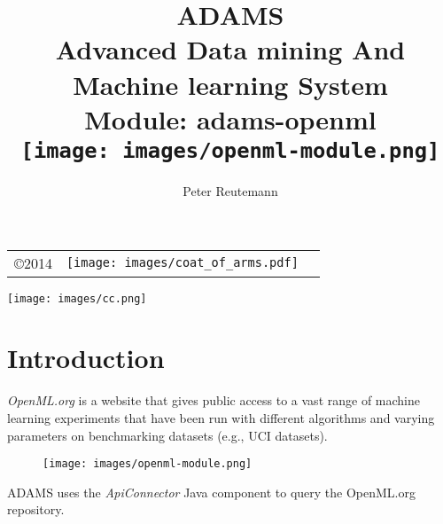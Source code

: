 \documentclass[a4paper]{book}
\title{
  \textbf{ADAMS} \\
  {\Large \textbf{A}dvanced \textbf{D}ata mining \textbf{A}nd \textbf{M}achine
  learning \textbf{S}ystem} \\
  {\Large Module: adams-openml} \\
  \vspace{1cm}
  \texttt{[image: images/openml-module.png]} \\
}
\author{
  Peter Reutemann
}
\begin{document}
\begin{titlepage}
\maketitle

\thispagestyle{empty}
\center
\begin{table}[b]
	\begin{tabular}{c l l}
		\parbox[c][2cm]{2cm}{\copyright 2014} &
		\parbox[c][2cm]{5cm}{\texttt{[image: images/coat\_of\_arms.pdf]}} \\
	\end{tabular}
	\texttt{[image: images/cc.png]} \\
\end{table}

\end{titlepage}

\tableofcontents
\listoffigures

\chapter{Introduction}
\textit{OpenML.org}\cite{openml} is a website that gives public access to a vast range of machine learning experiments that have been run with different algorithms and varying parameters on benchmarking datasets (e.g., UCI datasets).

\begin{figure}[htb]
  \centering
  \texttt{[image: images/openml-module.png]}
  \label{openml-module}
\end{figure}

ADAMS uses the \textit{ApiConnector} Java component \cite{apiconnector} to query the OpenML.org repository.

\end{document}
